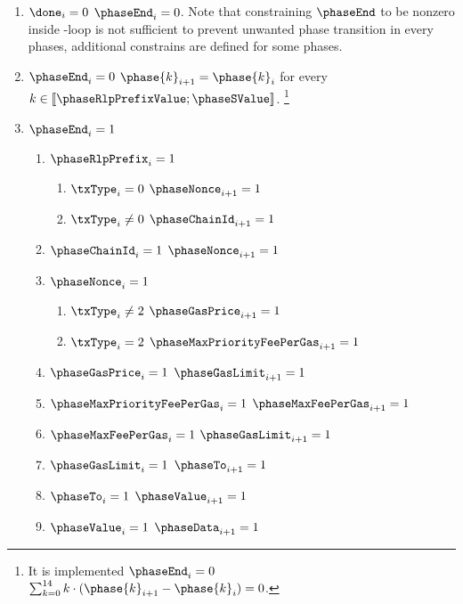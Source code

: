 \begin{enumerate}[resume]
    \item \If $\done_{i} = 0$ \Then $\phaseEnd_{i} = 0$. Note that constraining $\phaseEnd$ to be nonzero inside \ct -loop is not sufficient to prevent unwanted phase transition in every phases, additional constrains are defined for some phases.
    \item \If $\phaseEnd_{i} = 0$ \Then $\phase{k}_{i + 1} = \phase{k}_{i}$ for every $k \in [\![ \phaseRlpPrefixValue ; \phaseSValue ]\!]$. \footnote{It is implemented \If $\phaseEnd_{i} = 0$ \Then $\sum _{k = 0}^{14} k \cdot (\phase{k}_{i + 1} - \phase{k}_{i}) = 0$.}
    \item \If $\phaseEnd_{i} = 1$ \Then
        \begin{enumerate}
            \item \If $\phaseRlpPrefix_{i} = 1$ \Then 
                \begin{enumerate}
                    \item \If $\txType_{i} = 0$ \Then $\phaseNonce_{i + 1} = 1$
                    \item \If $\txType_{i} \neq 0$ \Then $\phaseChainId_{i + 1} = 1$
                \end{enumerate}
            \item \If $\phaseChainId_{i} = 1$ \Then $\phaseNonce_{i + 1} = 1$
            \item \If $\phaseNonce_{i} = 1$ \Then 
                \begin{enumerate}
                    \item \If $\txType_{i} \neq 2$ \Then $\phaseGasPrice_{i + 1} = 1$
                    \item \If $\txType_{i} = 2$ \Then $\phaseMaxPriorityFeePerGas_{i + 1} = 1$
                \end{enumerate}
            \item \If $\phaseGasPrice_{i} = 1$ \Then $\phaseGasLimit_{i + 1} = 1$
            \item \If $\phaseMaxPriorityFeePerGas_{i} = 1$ \Then $\phaseMaxFeePerGas_{i + 1} = 1$
            \item \If $\phaseMaxFeePerGas_{i} = 1$ \Then $\phaseGasLimit_{i + 1} = 1$
            \item \If $\phaseGasLimit_{i} = 1$ \Then $\phaseTo_{i + 1} = 1$
            \item \If $\phaseTo_{i} = 1$ \Then $\phaseValue_{i + 1} = 1$
            \item \If $\phaseValue_{i} = 1$ \Then $\phaseData_{i + 1} = 1$

\end{enumerate}
\end{enumerate}
